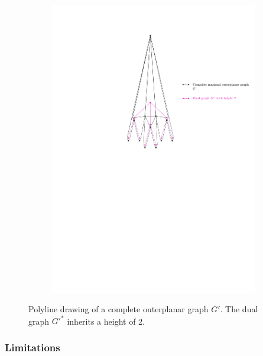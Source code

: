 	\begin{figure}[H]
	\centering
	\begin{subfigure}{\textwidth}
		\centering
		\includegraphics[page=1,width=0.7\linewidth]{graphics/complete_maximal_outerplanar_weak_dual_graph_example_drawing.pdf}
	\end{subfigure}
	\caption{Polyline drawing of a complete outerplanar graph $G'$. The dual graph $G'^*$ inherits a height of 2.}
\end{figure}


\subsubsection{Limitations}

